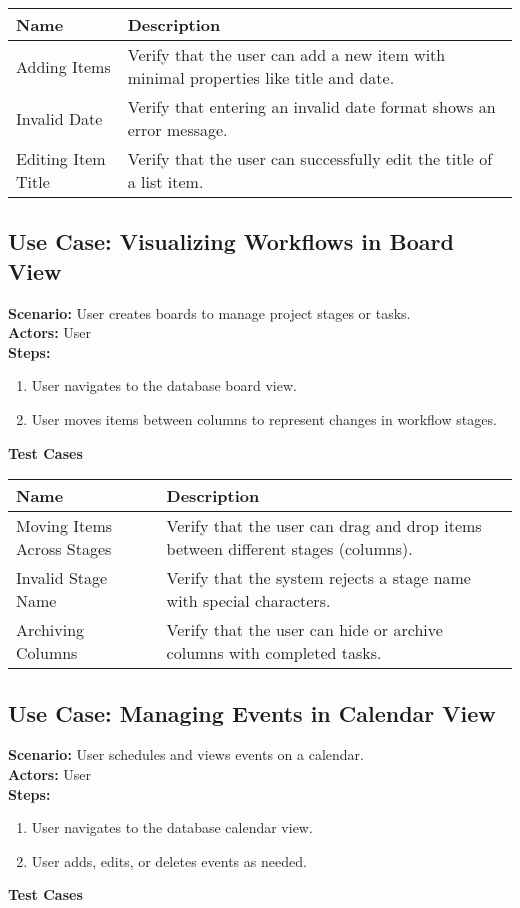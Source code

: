 \documentclass{article}
\begin{document}
            \begin{longtable}{|p{}|p{}|}
            \hline
            \textbf{Name} & \textbf{Description} \\
            \hline
            Adding Items & Verify that the user can add a new item with minimal properties like title and date. \\
\hline
Invalid Date & Verify that entering an invalid date format shows an error message. \\
\hline
Editing Item Title & Verify that the user can successfully edit the title of a list item. \\
\hline
\end{longtable}\subsection{\textbf{Use Case: Visualizing Workflows in Board View}}
\textbf{Scenario:} User creates boards to manage project stages or tasks.\\
\textbf{Actors:} User\\
\textbf{Steps:}
\begin{enumerate}
\item User navigates to the database board view.
\item User moves items between columns to represent changes in workflow stages.
\end{enumerate}
\textbf{Test Cases}

            \begin{longtable}{|p{}|p{}|}
            \hline
            \textbf{Name} & \textbf{Description} \\
            \hline
            Moving Items Across Stages & Verify that the user can drag and drop items between different stages (columns). \\
\hline
Invalid Stage Name & Verify that the system rejects a stage name with special characters. \\
\hline
Archiving Columns & Verify that the user can hide or archive columns with completed tasks. \\
\hline
\end{longtable}\subsection{\textbf{Use Case: Managing Events in Calendar View}}
\textbf{Scenario:} User schedules and views events on a calendar.\\
\textbf{Actors:} User\\
\textbf{Steps:}
\begin{enumerate}
\item User navigates to the database calendar view.
\item User adds, edits, or deletes events as needed.
\end{enumerate}
\textbf{Test Cases}
\end{document}
